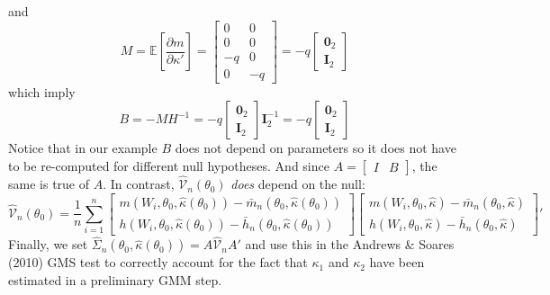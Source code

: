 \documentclass[12pt]{article}
\begin{document}
and 
\[
  M = \mathbb{E}\left[ \frac{\partial m}{\partial \kappa'} \right] = 
  \left[
  \begin{array}{rr}
    0 & 0 \\ 
    0 & 0 \\ 
    -q & 0 \\
    0 & -q 
  \end{array}
\right] = 
-q \left[
\begin{array}{c}
  \mathbf{0}_{2} \\ \mathbf{I}_2
\end{array}
\right]
\]
which imply 
\[
  B = -MH^{-1} = -q \left[
  \begin{array}{cc}
    \mathbf{0}_2\\ \mathbf{I}_2
  \end{array}
\right] \mathbf{I}_2^{-1} = -q \left[
\begin{array}{c}
  \mathbf{0}_{2} \\ \mathbf{I}_2
\end{array}
\right]
\]
Notice that in our example $B$ does not depend on parameters so it does not have to be re-computed for different null hypotheses.
And since $A = \left[
\begin{array}{cc}
  I & B
\end{array}
\right]$,
the same is true of $A$.
In contrast, $\widehat{\mathcal{V}}_n(\theta_0)$ \emph{does} depend on the null:
\[
  \widehat{\mathcal{V}}_n(\theta_0) = \frac{1}{n}\sum_{i=1}^n 
  \left[
  \begin{array}{c}
    m(W_i, \theta_0, \widehat{\kappa}(\theta_0)) - \bar{m}_n(\theta_0, \widehat{\kappa}(\theta_0))\\
    h(W_i, \theta_0, \widehat{\kappa}(\theta_0)) - \bar{h}_n(\theta_0, \widehat{\kappa}(\theta_0))
  \end{array}
\right]
  \left[
  \begin{array}{c}
    m(W_i, \theta_0, \widehat{\kappa}) - \bar{m}_n(\theta_0, \widehat{\kappa})\\
    h(W_i, \theta_0, \widehat{\kappa}) - \bar{h}_n(\theta_0, \widehat{\kappa})
  \end{array}
\right]'
\]
Finally, we set $\widehat{\Sigma}_n\left( \theta_0, \widehat{\kappa}(\theta_0) \right) = A \widehat{\mathcal{V}}_n A'$ and use this in the Andrews \& Soares (2010) GMS test to correctly account for the fact that $\kappa_1$ and $\kappa_2$ have been estimated in a preliminary GMM step.
\end{document}

